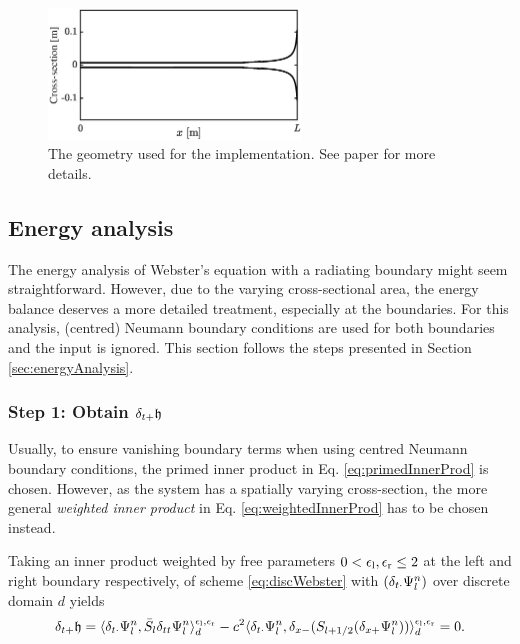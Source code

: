 {\renewcommand{\arraystretch}{1}

\hspace{0.1\textwidth}
\begin{figure}[h]
    \centering
    \includegraphics[width=0.6\textwidth]{figures/resonators/brass/geometryWebster.eps}
    \caption{The geometry used for the implementation. See paper \citeP[H] for more details. \label{fig:geometryWebster}}
\end{figure}


\subsection{Energy analysis}\label{sec:energyAnalysisWebster}
The energy analysis of Webster's equation with a radiating boundary might seem straightforward. However, due to the varying cross-sectional area, the energy balance deserves a more detailed treatment, especially at the boundaries. For this analysis, (centred) Neumann boundary conditions are used for both boundaries and the input is ignored. This section follows the steps presented in Section \ref{sec:energyAnalysis}.%

\subsubsection{Step 1: Obtain $\delta_{t+} \mathfrak{h}$}
Usually, to ensure vanishing boundary terms when using centred Neumann boundary conditions, the primed inner product in Eq. \eqref{eq:primedInnerProd} is chosen. However, as the system has a spatially varying cross-section, the more general \textit{weighted inner product} in Eq. \eqref{eq:weightedInnerProd} has to be chosen instead.

Taking an inner product weighted by free parameters $0 < \epsilon_\text{l}, \epsilon_\text{r} \leq 2$ at the left and right boundary respectively, of scheme \eqref{eq:discWebster} with $(\delta_{t\cdot} \Psi_l^n)$ over discrete domain $d$ yields 
\begin{equation}\label{eq:powerBalanceWebster}
    \delta_{t+} \mathfrak{h} = \langle \delta_{t\cdot}\Psi_l^n ,\bar{S}_l \delta_{tt}\Psi^n_l\rangle_d^{\epsilon_\text{l},\epsilon_\text{r}} - c^2\langle\delta_{t\cdot}\Psi_l^n, \delta_{x-}(S_{l+1/2}(\delta_{x+}\Psi_l^n))\rangle_d^{\epsilon_\text{l},\epsilon_\text{r}} = 0.
\end{equation}

}
